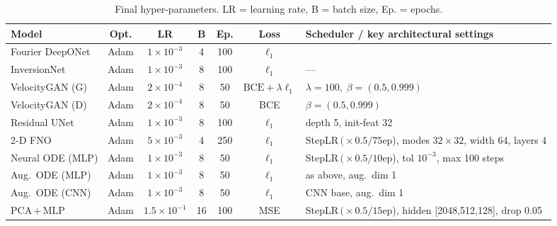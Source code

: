 \documentclass{article}
\begin{document}
\begin{table}
    \centering
    \footnotesize
    \renewcommand\arraystretch{1.05}
    \begin{tabularx}{\linewidth}{@{}l c c c c c Y@{}}
    \toprule
    \textbf{Model} & \textbf{Opt.} & \textbf{LR} & \textbf{B} & \textbf{Ep.} & \textbf{Loss} & \textbf{Scheduler / key architectural settings} \\
    \midrule
    Fourier DeepONet      & Adam & $1\!\times\!10^{-3}$ & 4  & 100 & $\ell_1$ &
     \\
    
    InversionNet          & Adam & $1\!\times\!10^{-3}$ & 8  & 100 & $\ell_1$ &
    --- \\
    
    VelocityGAN (G)       & Adam & $2\!\times\!10^{-4}$ & 8  & 50  & $\text{BCE}+\lambda\ell_1$ &
    $\lambda\!=\!100,\;\beta=(0.5,0.999)$ \\
    
    VelocityGAN (D)       & Adam & $2\!\times\!10^{-4}$ & 8  & 50  & BCE &
    $\beta=(0.5,0.999)$ \\
    
    Residual UNet         & Adam & $1\!\times\!10^{-3}$ & 8  & 100 & $\ell_1$ &
    depth 5,\; init‐feat 32 \\
    
    2-D FNO               & Adam & $5\!\times\!10^{-3}$ & 4  & 250 & $\ell_1$ &
    StepLR$\,(\!\times0.5\!/\!75$ep), modes $32\!\times\!32$, width 64, layers 4 \\
    
    Neural ODE (MLP)      & Adam & $1\!\times\!10^{-3}$ & 8  & 50  & $\ell_1$ &
    StepLR$\,(\!\times0.5\!/\!10$ep), tol $10^{-3}$, max 100 steps \\
    
    Aug.\ ODE (MLP)       & Adam & $1\!\times\!10^{-3}$ & 8  & 50  & $\ell_1$ &
    as above,\; aug.\ dim 1 \\
    
    Aug.\ ODE (CNN)       & Adam & $1\!\times\!10^{-3}$ & 8  & 50  & $\ell_1$ &
    CNN base,\; aug.\ dim 1 \\
    
    PCA\,+\,MLP           & Adam & $1.5\!\times\!10^{-1}$ & 16 & 100 & MSE &
    StepLR$\,(\!\times0.5\!/\!15$ep), hidden [2048,512,128], drop 0.05 \\
    \bottomrule
    \end{tabularx}
    \caption{Final hyper-parameters.  LR = learning rate, B = batch size, Ep. = epochs.}
    \label{tab:hparams}
\end{table}
\end{document}
